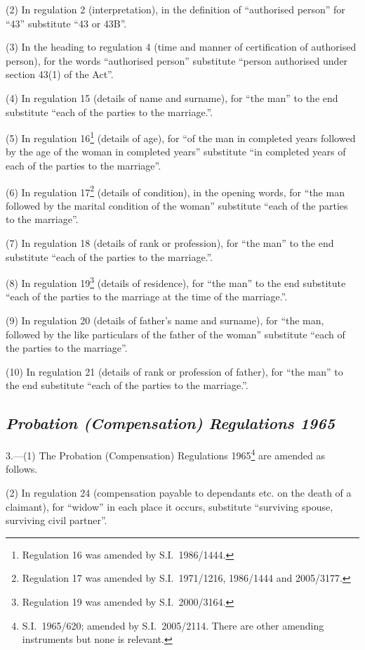 \documentclass[12pt,a4paper]{article}
\begin{document}
(2) In regulation 2 (interpretation), in the definition of “authorised person” for “43” substitute “43 or 43B”.

(3) In the heading to regulation 4 (time and manner of certification of authorised person), for the words “authorised person” substitute “person authorised under section 43(1) of the Act”.

(4) In regulation 15 (details of name and surname), for “the man” to the end substitute “each of the parties to the marriage.”.

(5) In regulation 16\footnote{Regulation 16 was amended by S.I.~1986/1444.} (details of age), for “of the man in completed years followed by the age of the woman in completed years” substitute “in completed years of each of the parties to the marriage”.

(6) In regulation 17\footnote{Regulation 17 was amended by S.I.~1971/1216, 1986/1444 and 2005/3177.} (details of condition), in the opening words, for “the man followed by the marital condition of the woman” substitute “each of the parties to the marriage”.

(7) In regulation 18 (details of rank or profession), for “the man” to the end substitute “each of the parties to the marriage.”.

(8) In regulation 19\footnote{Regulation 19 was amended by S.I.~2000/3164.} (details of residence), for “the man” to the end substitute “each of the parties to the marriage at the time of the marriage.”.

(9) In regulation 20 (details of father’s name and surname), for “the man, followed by the like particulars of the father of the woman” substitute “each of the parties to the marriage”.

(10) In regulation 21 (details of rank or profession of father), for “the man” to the end substitute “each of the parties to the marriage.”.

\subsection*{\itshape Probation (Compensation) Regulations 1965}

3.—(1) The Probation (Compensation) Regulations 1965\footnote{S.I.~1965/620; amended by S.I.~2005/2114. There are other amending instruments but none is relevant.} are amended as follows.

(2) In regulation 24 (compensation payable to dependants etc. on the death of a claimant), for “widow” in each place it occurs, substitute “surviving spouse, surviving civil partner”.
\end{document}
